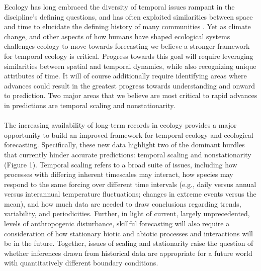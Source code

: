 \documentclass[11pt,a4paper,oneside]{article}
\begin{document}
Ecology has long embraced the diversity of temporal issues rampant in the discipline's defining questions, and has often exploited similarities between space and time to elucidate the defining history of many communities \citep{wiens1986}. Yet as climate change, and other aspects of how humans have shaped ecological systems challenges ecology to move towards forecasting we believe a stronger framework for temporal ecology is critical. Progress towards this goal will require leveraging similarities between spatial and temporal dynamics, while also recognizing unique attributes of time. It will of course additionally require identifying areas where advances could result in the greatest progress towards understanding and onward to prediction. Two major areas that we believe are most critical to rapid advances in predictions are temporal scaling and nonstationarity. \\

\\

The increasing availability of long-term records in ecology provides a major opportunity to build an improved framework for temporal ecology and ecological forecasting. Specifically, these new data highlight two of the dominant hurdles that currently hinder accurate predictions: temporal scaling and nonstationarity (Figure 1). Temporal scaling refers to a broad suite of issues, including how processes with differing inherent timescales may interact, how species may respond to the same forcing over different time intervals (e.g., daily versus annual versus interannual temperature fluctuations; changes in extreme events versus the mean), and how much data are needed to draw conclusions regarding trends, variability, and periodicities. Further, in light of current, largely unprecedented, levels of anthropogenic disturbance, skillful forecasting will also require a consideration of how stationary biotic and abiotic processes and interactions will be in the future. Together, issues of scaling and stationarity raise the question of whether inferences drawn from historical data are appropriate for a future world with quantitatively different boundary conditions.\\
\end{document}
